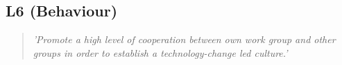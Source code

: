 \subsection*{L6 (Behaviour)}

  \begin{quote}
    \textit{'Promote a high level of cooperation
    between own work group and other groups in order to
    establish a technology-change led culture.'}
  \end{quote}

\newpage
